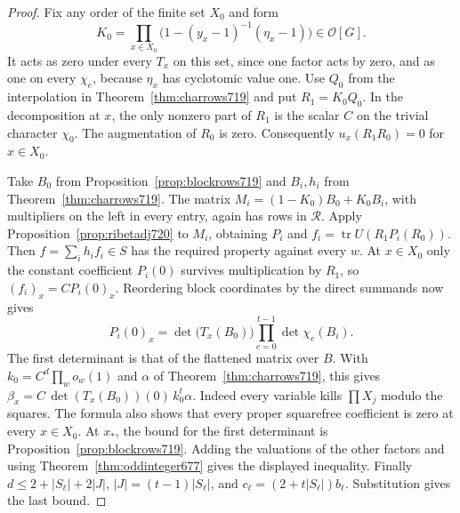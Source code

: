 \documentclass[a4paper,11pt]{article}
\theoremstyle{definition}
\theoremstyle{remark}
\numberwithin{equation}{section}
\begin{document}
\begin{proof}
Fix any order of the finite set \(X_0\) and form
\[
      K_0=\prod_{x\in X_0}
          \bigl(1-(y_x-1)^{-1}(\eta_x-1)\bigr)\in\mathcal O[G].
\]
It acts as zero under every \(T_x\) on this set, since one
factor acts by zero, and as one on every \(\chi_e\), because
\(\eta_x\) has cyclotomic value one. Use \(Q_0\) from the
interpolation in Theorem~\ref{thm:charrows719} and put
\(R_1=K_0Q_0\). In the decomposition at \(x\), the only
nonzero part of \(R_1\) is the scalar \(C\) on the trivial
character \(\chi_0\). The augmentation of \(R_0\) is zero.
Consequently \(u_x(R_1R_0)=0\) for \(x\in X_0\).

Take \(B_0\) from Proposition~\ref{prop:blockrows719} and
\(B_i,h_i\) from Theorem~\ref{thm:charrows719}.
The matrix \(M_i=(1-K_0)B_0+K_0B_i\), with multipliers
on the left in every entry, again has rows in \(\mathcal R\).
Apply Proposition~\ref{prop:ribetadj720} to \(M_i\), obtaining
\(P_i\) and \(f_i=\operatorname{tr}U(R_1P_i(R_0))\).
Then \(f=\sum_i h_i f_i\in S\) has the required property
against every \(w\). At \(x\in X_0\) only the constant
coefficient \(P_i(0)\) survives multiplication by \(R_1\),
so \((f_i)_x=C P_i(0)_x\).
Reordering block coordinates by the direct summands now gives
\[
       P_i(0)_x
        =\det\bigl(T_x(B_0)\bigr)
                     \prod_{e=0}^{t-1}\det\chi_e(B_i).
\]
The first determinant is that of the flattened matrix over
\(B\). With \(k_0=C^d\prod_w o_w(1)\) and \(\alpha\) of
Theorem~\ref{thm:charrows719}, this gives
\(\beta_x=C\,\det(T_x(B_0))(0)\,k_0^t\alpha\). Indeed every
variable kills \(\prod X_j\) modulo the squares. The formula
also shows that every proper squarefree coefficient is zero
at every \(x\in X_0\). At \(x_*\), the bound for the first
determinant is Proposition~\ref{prop:blockrows719}.
Adding the valuations of the other factors and using
Theorem~\ref{thm:oddinteger677} gives the displayed inequality.
Finally \(d\le 2+|S_\ell|+2|J|\), \(|J|=(t-1)|S_\ell|\), and
\(c_\ell=(2+t|S_\ell|)b_\ell\). Substitution gives the last
bound.
\end{proof}
\end{document}

